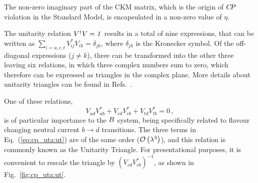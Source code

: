 \vspace{-5mm}
\noindent
The non-zero imaginary part of the CKM matrix,
which is the origin of $C\!P$ violation in the Standard Model,
is encapsulated in a non-zero value of $\eta$.



The unitarity relation ${V}^\dagger{V} = {\mathit 1}$
results in a total of nine expressions,
that can be written as
$\sum_{i=u,c,t} V_{ij}^*V_{ik} = \delta_{jk}$,
where $\delta_{jk}$ is the Kronecker symbol.
Of the off-diagonal expressions ($j \neq k$),
three can be transformed into the other three 
leaving six relations, in which three complex numbers sum to zero,
which therefore can be expressed as triangles in the complex plane.
More details about unitarity triangles can be found in Refs.~\cite{Jarlskog:1985ht,Jarlskog:2005uq,Bjorken:2005rm,Harrison:2009bz,Frampton:2010ii,Frampton:2010uq}.

One of these relations,
\begin{equation}
  \label{eq:cp_uta:ut}
  V_{ud}V_{ub}^* + V_{cd}V_{cb}^* + V_{td}V_{tb}^* = 0\,,
\end{equation}
is of particular importance to the $B$ system, 
being specifically related to flavour changing 
neutral current $b \to d$ transitions.
The three terms in Eq.~(\ref{eq:cp_uta:ut}) are of the same order 
(${\cal O}\left( \lambda^3 \right)$),
and this relation is commonly known as the Unitarity Triangle.
For presentational purposes,
it is convenient to rescale the triangle by $(V_{cd}V_{cb}^*)^{-1}$,
as shown in Fig.~\ref{fig:cp_uta:ut}.

